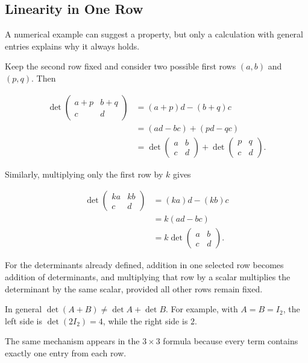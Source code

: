 \subsection{Linearity in One Row}

\begin{corebox}
A numerical example can suggest a property, but only a calculation with general entries explains why it always holds.
\end{corebox}

Keep the second row fixed and consider two possible first rows $(a,b)$ and $(p,q)$. Then
\begin{derivationbox}
\begin{align*}
\det\begin{pmatrix}a+p&b+q\\c&d\end{pmatrix}
&=(a+p)d-(b+q)c\\
&=(ad-bc)+(pd-qc)\\
&=\det\begin{pmatrix}a&b\\c&d\end{pmatrix}
+\det\begin{pmatrix}p&q\\c&d\end{pmatrix}.
\end{align*}
\end{derivationbox}

Similarly, multiplying only the first row by $k$ gives
\begin{derivationbox}
\begin{align*}
\det\begin{pmatrix}ka&kb\\c&d\end{pmatrix}
&=(ka)d-(kb)c\\
&=k(ad-bc)\\
&=k\det\begin{pmatrix}a&b\\c&d\end{pmatrix}.
\end{align*}
\end{derivationbox}

\begin{theorembox}
For the determinants already defined, addition in one selected row becomes addition of determinants, and multiplying that row by a scalar multiplies the determinant by the same scalar, provided all other rows remain fixed.
\end{theorembox}

\begin{remarkbox}
In general $\det(A+B)\neq\det A+\det B$. For example, with $A=B=I_2$, the left side is $\det(2I_2)=4$, while the right side is $2$.
\end{remarkbox}

The same mechanism appears in the $3\times3$ formula because every term contains exactly one entry from each row.
